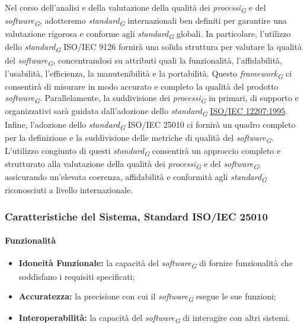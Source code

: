 Nel corso dell'analisi e della valutazione della qualità dei \textit{processi}\textsubscript{\textit{G}} e del \textit{software}\textsubscript{\textit{G}}, adotteremo \textit{standard}\textsubscript{\textit{G}} internazionali ben definiti per garantire una valutazione rigorosa e conforme agli \textit{standard}\textsubscript{\textit{G}} globali. In particolare, l'utilizzo dello \textit{standard}\textsubscript{\textit{G}} ISO/IEC 9126 fornirà una solida struttura per valutare la qualità del \textit{software}\textsubscript{\textit{G}}, concentrandosi su attributi quali la funzionalità, l'affidabilità, l'usabilità, l'efficienza, la manutenibilità e la portabilità. Questo \textit{framework}\textsubscript{\textit{G}} ci consentirà di misurare in modo accurato e completo la qualità del prodotto \textit{software}\textsubscript{\textit{G}}. Parallelamente, la suddivisione dei \textit{processi}\textsubscript{\textit{G}} in primari, di supporto e organizzativi sarà guidata dall'adozione dello \textit{standard}\textsubscript{\textit{G}} \href{https://www.math.unipd.it/~tullio/IS-1/2009/Approfondimenti/ISO_12207-1995.pdf}{ISO/IEC 12207:1995}. Infine, l'adozione dello \textit{standard}\textsubscript{\textit{G}} ISO/IEC 25010 ci fornirà un quadro completo per la definizione e la suddivisione delle metriche di qualità del \textit{software}\textsubscript{\textit{G}}.
L'utilizzo congiunto di questi \textit{standard}\textsubscript{\textit{G}} consentirà un approccio completo e strutturato alla valutazione della qualità dei \textit{processi}\textsubscript{\textit{G}} e del \textit{software}\textsubscript{\textit{G}}, assicurando un'elevata coerenza, affidabilità e conformità agli \textit{standard}\textsubscript{\textit{G}} riconosciuti a livello internazionale.

\subsubsection{Caratteristiche del Sistema, Standard ISO/IEC 25010}

\paragraph{Funzionalità}
\begin{itemize}
    \item \textbf{Idoneità Funzionale:} la capacità del \textit{software}\textsubscript{\textit{G}} di fornire funzionalità che soddisfano i requisiti specificati;
    \item \textbf{Accuratezza:} la precisione con cui il \textit{software}\textsubscript{\textit{G}} esegue le sue funzioni;
    \item \textbf{Interoperabilità:} la capacità del \textit{software}\textsubscript{\textit{G}} di interagire con altri sistemi.
\end{itemize}

